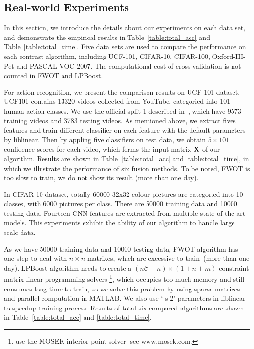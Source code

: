 \documentclass[10pt,twocolumn,letterpaper]{article}
\def\calC{{\mathcal{C}}}
\def\bX{{\bf X}}
\def\bX{{\bf X}}
\begin{document}
\subsection{Real-world Experiments}

In this section, we introduce the details about our experiments on each data set,
and demonstrate the empirical results in Table~\ref{table:total_acc} and Table~\ref{table:total_time}.
Five data sets are used to compare the performance on each contrast algorithm, including UCF-101, CIFAR-10, CIFAR-100, Oxford-III-Pet and PASCAL VOC 2007.
The computational cost of cross-validation is not counted in FWOT and LPBoost.

For action recognition, we present the comparison results on UCF 101 dataset.
UCF101 contains 13320 videos collected from YouTube, categoried into 101 human action classes.
We use the official split-1 described in~\cite{soomro2012ucf101}, which have 9573 training videos and 3783 testing videos.
As mentioned above, we extract fives features and train different classifier on each feature with the default parameters by liblinear.
Then by appling five classifiers on test data, we obtain $5 \times 101$ confidence scores for each video, which forms the input matrix $\bX$ of our algorithm.
Results are shown in Table~\ref{table:total_acc} and \ref{table:total_time}, in which we illustrate the performance of six fusion methods.
To be noted, FWOT is too slow to train, we do not show its result (more than one day).




In CIFAR-10 dataset, totally 60000 32x32 colour pictures are categoried into 10 classes, with 6000 pictures per class.
There are 50000 training data and 10000 testing data.
Fourteen CNN features are extracted from multiple state of the art models.
This experiments exhibit the ability of our algorithm to handle large scale data.

As we have 50000 training data and 10000 testing data,
FWOT algorithm has one step to deal with $n\times n$ matrixes, which are excessive to train~(more than one day).
LPBoost algorithm needs to create a $(n\calC - n) \times (1 + n + m)$ constraint matrix linear programming solvers
\footnote{\cite{gehler2009feature} use the MOSEK interior-point solver, see www.mosek.com.},
which occupies too much memory and still consumes long time to train,
so we solve this problem by using sparse matrices and parallel computation in MATLAB.
We also use `-s 2' parameters in liblinear to speedup training process.
Results of total six compared algorithms are shown in Table~\ref{table:total_acc} and \ref{table:total_time}.
\end{document}
